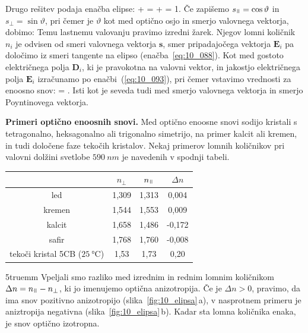 Drugo rešitev podaja enačba elipse:
\beq
{}+  = 
+  = 
1.
\label{eq:10_104}
\eeq
Če zapišemo $s_\myparallel = \cos \vartheta$ in $s_\perp = \sin \vartheta$, pri čemer je 
$\vartheta$ kot med optično osjo in smerjo valovnega vektorja, dobimo:
Temu lastnemu valovanju pravimo izredni žarek. Njegov lomni količnik $n_i$ je odvisen od 
smeri valovnega vektorja $\mathbf{s}$, smer pripadajočega vektorja $\mathbf{E}_i$
pa določimo iz smeri tangente na elipso (enačba~\ref{eq:10_088}). Kot med gostoto električnega
polja $\mathbf{D}_i$, ki je pravokotna na valovni vektor, in jakostjo električnega polja 
$\mathbf{E}_i$ izračunamo po enačbi~(\ref{eq:10_093}), pri čemer vstavimo vrednosti 
za enoosno snov:
\beq
\cos \gamma = .
\label{eq:10_105}
\eeq
Isti kot je seveda tudi med smerjo valovnega vektorja in smerjo Poyntinovega vektorja.

\begin{example}{\bf Primeri optično enoosnih snovi.} Med optično enoosne snovi 
sodijo kristali s tetragonalno, heksagonalno ali trigonalno simetrijo, na primer
kalcit ali kremen, in tudi določene faze tekočih kristalov. 
Nekaj primerov lomnih količnikov pri valovni dolžini svetlobe 
$590~\si{nm}$ je navedenih v spodnji tabeli.
\begin{center}
\begin{tabular}{|c|c|c|c|} \hline
 & $n_\perp$ & $n_\myparallel$ & $\Delta n$\\ \hline
led & 1,309 & 1,313 & 0,004 \\ \hline
kremen & 1,544 & 1,553 & 0,009\\ \hline
kalcit & 1,658 & 1,486 & -0,172\\ \hline
safir & 1,768 & 1,760 & -0,008 \\ \hline
tekoči kristal 5CB ($25~\si{\celsius}$) & 1,53 & 1,73 & 0,20 \\ \hline
\end{tabular}
\end{center}
\vglue5truemm
Vpeljali smo razliko med izrednim in rednim lomnim količnikom
$\Delta n = n_\myparallel - n_\perp$, ki jo imenujemo optična anizotropija. 
Če je $\Delta n >0$, pravimo, da ima snov pozitivno anizotropijo 
(slika~\ref{fig:10_elipsa}\,a), v nasprotnem 
primeru je aniztropija negativna (slika~\ref{fig:10_elipsa}\,b). 
Kadar sta lomna količnika enaka, je snov optično izotropna.
\end{example}


